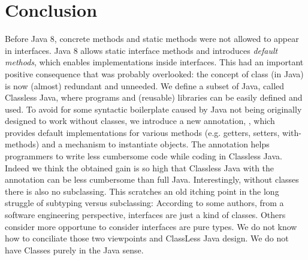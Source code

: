 \section{Conclusion}\label{sec:conclusion}

Before Java 8, concrete methods and static methods were not allowed
to appear in interfaces.  Java 8 allows static interface methods and
introduces \emph{default methods}, which enables implementations
inside interfaces. This had an important positive consequence that
was probably overlooked: the concept of class
(in Java) is now (almost) redundant and unneeded.  We define a subset of Java,
called Classless Java, where programs and (reusable) libraries can be
easily defined and used.  To avoid for some syntactic boilerplate
caused by Java not being originally designed to work without classes,
we introduce a new annotation, \mixin, which provides default implementations
for various methods (e.g. getters, setters, with-methods) and a
mechanism to instantiate objects. The \mixin annotation helps programmers
to write less cumbersome code while coding in Classless Java. Indeed
we think the obtained gain is so high that Classless Java with the \mixin
annotation can be less cumbersome than full Java.
Interestingly, without classes there is also no subclassing. This scratches an old
  itching point in the long struggle of subtyping versus subclassing:
  According to some authors, from a software engineering perspective,
  interfaces are just a kind of classes. Others consider more
  opportune to consider interfaces are pure types. We do not know how to conciliate
  those two viewpoints and ClassLess Java design. We do not have
  Classes purely in the Java sense.

